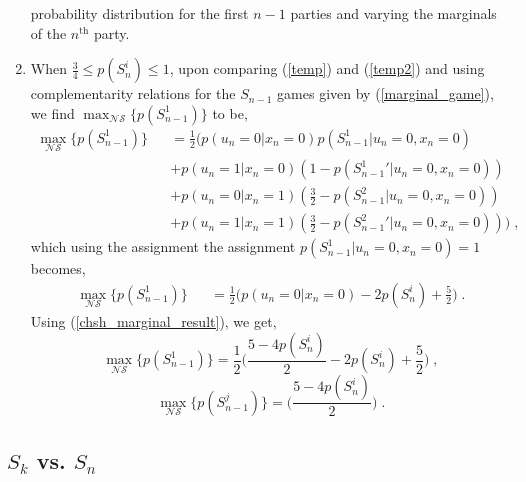 \begin{widetext}
\begin{appendices}
\begin{enumerate}
probability distribution for the first $n-1$ parties and varying the marginals of the $n^{\text{th}}$ party.
\item When $\frac{3}{4} \le p({S_n^i}) \le 1$, upon comparing (\ref{temp}) and (\ref{temp2}) and using complementarity relations for the $S_{n-1}$ games given by (\ref{marginal_game}), we find $\max_{\mathcal{NS}}\{p(S_{n-1}^1)\}$ to be,
\begin{eqnarray}
\label{general_win_probability23}
\max_{\mathcal{NS}}\{p(S_{n-1}^1)\} &&= \frac{1}{2} \bigg( p(u_n=0|x_n=0)p(S_{n-1}^1|{u_n=0,x_n=0}){}\nonumber\\&&+p(u_n=1|x_n=0)(1-p({S_{n-1}^1}'|{u_n=0,x_n=0})){}\nonumber\\&&
+p(u_n=0|x_n=1)(\frac{3}{2}-p(S_{n-1}^2|{u_n=0,x_n=0})){}\nonumber\\&&+p(u_n=1|x_n=1)(\frac{3}{2}-p({S_{n-1}^2}'|{u_n=0,x_n=0})) \bigg) \; ,
\end{eqnarray}
which using the assignment the assignment $p({S_{n-1}^1}|{u_n=0,x_n=0})=1$ becomes,
\begin{eqnarray}
\label{general_win_probability3}
\max_{\mathcal{NS}}\{p({S_{n-1}^1})\} &&= \frac{1}{2} \bigg( p(u_n=0|x_n=0)-2p({S_{n}^i})+\frac{5}{2}\bigg) \; .
\end{eqnarray}
Using (\ref{chsh_marginal_result}), we get,
\begin{equation}
\max_{\mathcal{NS}}\{p({S_{n-1}^1})\}= \frac{1}{2} \bigg( \frac{5-4p({S_{n}^i})}{2}-2p({S_{n}^i})+\frac{5}{2}\bigg) \; ,
\end{equation}
\begin{equation}
\max_{\mathcal{NS}}\{p({S_{n-1}^j})\} =  \bigg( \frac{5-4p({S_{n}^i})}{2} \bigg) \; .
\end{equation}

\end{enumerate}
\subsection*{$S_{k}$ vs. $S_n$}


\end{appendices}
\end{widetext}
